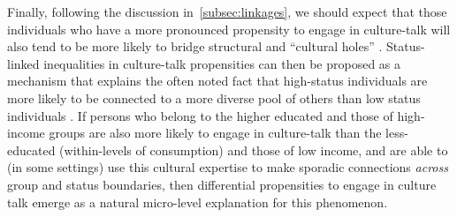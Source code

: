 Finally, following the discussion in~\ref{subsec:linkages}, we should expect that those individuals who have a more pronounced propensity to engage in culture-talk will also tend to be more likely to bridge structural and ``cultural holes'' \citep{pachucki_breiger10, schultz_breiger10, lizardo06a}.   Status-linked inequalities in culture-talk propensities can then be proposed as a mechanism that explains the often noted fact that high-status individuals are more likely to be connected to a more diverse pool of others than low status individuals \citep{marsden87, erickson96, erickson08, lin_dumin86, lin99, goldstein_warren00, diprete_etal11}.   If persons who belong to the higher educated and those of high-income groups are also more likely to engage in culture-talk than the less-educated (within-levels of consumption) and those of low income, and are able to (in some settings) use this cultural expertise to make sporadic connections \emph{across} group and status boundaries, then differential propensities to engage in culture talk emerge as a natural micro-level explanation for this phenomenon. 
 